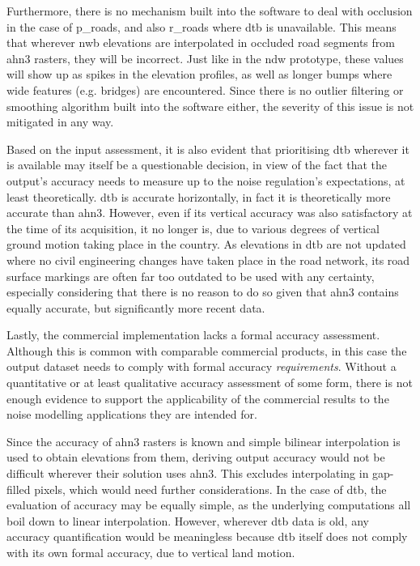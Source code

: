 Furthermore, there is no mechanism built into the software to deal with occlusion in the case of \ac{p_roads}, and also \ac{r_roads} where \ac{dtb} is unavailable. This means that wherever \ac{nwb} elevations are interpolated in occluded road segments from \ac{ahn3} rasters, they will be incorrect. Just like in the \ac{ndw} prototype, these values will show up as spikes in the elevation profiles, as well as longer bumps where wide features (e.g. bridges) are encountered. Since there is no outlier filtering or smoothing algorithm built into the software either, the severity of this issue is not mitigated in any way.

Based on the input assessment, it is also evident that prioritising \ac{dtb} wherever it is available may itself be a questionable decision, in view of the fact that the output's accuracy needs to measure up to the noise regulation's expectations, at least theoretically. \ac{dtb} is accurate horizontally, in fact it is theoretically more accurate than \ac{ahn3}. However, even if its vertical accuracy was also satisfactory at the time of its acquisition, it no longer is, due to various degrees of vertical ground motion taking place in the country. As elevations in \ac{dtb} are not updated where no civil engineering changes have taken place in the road network, its road surface markings are often far too outdated to be used with any certainty, especially considering that there is no reason to do so given that \ac{ahn3} contains equally accurate, but significantly more recent data.

Lastly, the commercial implementation lacks a formal accuracy assessment. Although this is common with comparable commercial products, in this case the output dataset needs to comply with formal accuracy \textit{requirements}. Without a quantitative or at least qualitative accuracy assessment of some form, there is not enough evidence to support the applicability of the commercial results to the noise modelling applications they are intended for.

Since the accuracy of \ac{ahn3} rasters is known and simple bilinear interpolation is used to obtain elevations from them, deriving output accuracy would not be difficult wherever their solution uses \ac{ahn3}. This excludes interpolating in gap-filled pixels, which would need further considerations. In the case of \ac{dtb}, the evaluation of accuracy may be equally simple, as the underlying computations all boil down to linear interpolation. However, wherever \ac{dtb} data is old, any accuracy quantification would be meaningless because \ac{dtb} itself does not comply with its own formal accuracy, due to vertical land motion.